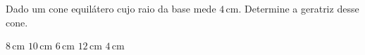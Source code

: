 Dado um cone equilátero cujo raio da base mede $4$\,cm. Determine a geratriz desse cone.

$8$\,cm
$10$\,cm
$6$\,cm
$12$\,cm
$4$\,cm




